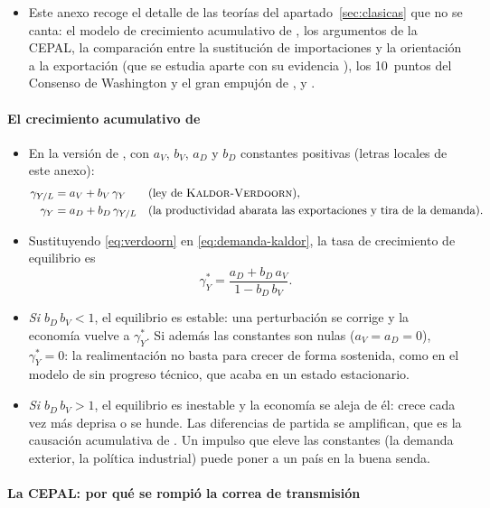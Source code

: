 \documentclass[11pt]{article}
\begin{document}
\begin{itemize}
\item Este anexo recoge el detalle de las teorías del apartado~\ref{sec:clasicas} que no se canta: el modelo de crecimiento acumulativo de , los argumentos de la CEPAL, la comparación entre la sustitución de importaciones y la orientación a la exportación (que se estudia aparte con su evidencia ), los 10~puntos del Consenso de Washington y el gran empujón de ,  y .
\end{itemize}

\paragraph{El crecimiento acumulativo de }

\begin{itemize}
\item En la versión de \textcite{DixonThirlwall1975}, con $a_V$, $b_V$, $a_D$ y $b_D$ constantes positivas (letras locales de este anexo):
  \begin{align}
  \gamma_{Y/L}&=a_V+b_V\,\gamma_Y &&\text{(ley de \textsc{Kaldor}-\textsc{Verdoorn})},\label{eq:verdoorn}\\
  \gamma_Y&=a_D+b_D\,\gamma_{Y/L} &&\text{(la productividad abarata las exportaciones y tira de la demanda)}.\label{eq:demanda-kaldor}
  \end{align}
\item Sustituyendo \eqref{eq:verdoorn} en \eqref{eq:demanda-kaldor}, la tasa de crecimiento de equilibrio es
  \[
  \gamma_Y^*=\frac{a_D+b_D\,a_V}{1-b_D\,b_V}.
  \]
\item \emph{Si $b_D\,b_V<1$}, el equilibrio es estable: una perturbación se corrige y la economía vuelve a $\gamma_Y^*$. Si además las constantes son nulas ($a_V=a_D=0$), $\gamma_Y^*=0$: la realimentación no basta para crecer de forma sostenida, como en el modelo de  sin progreso técnico, que acaba en un estado estacionario.
\item \emph{Si $b_D\,b_V>1$}, el equilibrio es inestable y la economía se aleja de él: crece cada vez más deprisa o se hunde. Las diferencias de partida se amplifican, que es la causación acumulativa de . Un impulso que eleve las constantes (la demanda exterior, la política industrial) puede poner a un país en la buena senda.
\end{itemize}

\paragraph{La CEPAL: por qué se rompió la correa de transmisión}
\end{document}
